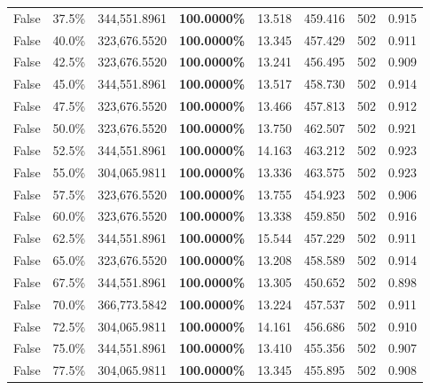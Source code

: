 \begin{table}[H]
\begin{tabular}{lllrllll}
\cline{1-8}
False & 37.5\% & 344,551.8961 & \bfseries \color{red} 100.0000\% & 13.518 & 459.416 & 502 & 0.915 \\
\cline{1-8}
False & 40.0\% & 323,676.5520 & \bfseries \color{red} 100.0000\% & 13.345 & 457.429 & 502 & 0.911 \\
\cline{1-8}
False & 42.5\% & 323,676.5520 & \bfseries \color{red} 100.0000\% & 13.241 & 456.495 & 502 & 0.909 \\
\cline{1-8}
False & 45.0\% & 344,551.8961 & \bfseries \color{red} 100.0000\% & 13.517 & 458.730 & 502 & 0.914 \\
\cline{1-8}
False & 47.5\% & 323,676.5520 & \bfseries \color{red} 100.0000\% & 13.466 & 457.813 & 502 & 0.912 \\
\cline{1-8}
False & 50.0\% & 323,676.5520 & \bfseries \color{red} 100.0000\% & 13.750 & 462.507 & 502 & 0.921 \\
\cline{1-8}
False & 52.5\% & 344,551.8961 & \bfseries \color{red} 100.0000\% & 14.163 & 463.212 & 502 & 0.923 \\
\cline{1-8}
False & 55.0\% & 304,065.9811 & \bfseries \color{red} 100.0000\% & 13.336 & 463.575 & 502 & 0.923 \\
\cline{1-8}
False & 57.5\% & 323,676.5520 & \bfseries \color{red} 100.0000\% & 13.755 & 454.923 & 502 & 0.906 \\
\cline{1-8}
False & 60.0\% & 323,676.5520 & \bfseries \color{red} 100.0000\% & 13.338 & 459.850 & 502 & 0.916 \\
\cline{1-8}
False & 62.5\% & 344,551.8961 & \bfseries \color{red} 100.0000\% & 15.544 & 457.229 & 502 & 0.911 \\
\cline{1-8}
False & 65.0\% & 323,676.5520 & \bfseries \color{red} 100.0000\% & 13.208 & 458.589 & 502 & 0.914 \\
\cline{1-8}
False & 67.5\% & 344,551.8961 & \bfseries \color{red} 100.0000\% & 13.305 & 450.652 & 502 & 0.898 \\
\cline{1-8}
False & 70.0\% & 366,773.5842 & \bfseries \color{red} 100.0000\% & 13.224 & 457.537 & 502 & 0.911 \\
\cline{1-8}
False & 72.5\% & 304,065.9811 & \bfseries \color{red} 100.0000\% & 14.161 & 456.686 & 502 & 0.910 \\
\cline{1-8}
False & 75.0\% & 344,551.8961 & \bfseries \color{red} 100.0000\% & 13.410 & 455.356 & 502 & 0.907 \\
\cline{1-8}
False & 77.5\% & 304,065.9811 & \bfseries \color{red} 100.0000\% & 13.345 & 455.895 & 502 & 0.908 \\

\end{tabular}
\end{table}

